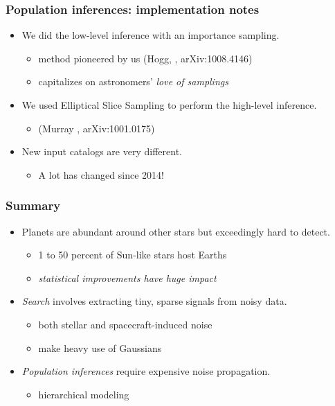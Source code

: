 \documentclass[pdftex]{beamer}
\newcommand{\conclusions}{%
\begin{frame}
  \frametitle{Summary}
  \begin{itemize}
  \item Planets are abundant around other stars but exceedingly hard to detect.
    \begin{itemize}
    \item 1 to 50 percent of Sun-like stars host Earths
    \item \emph{statistical improvements have huge impact}
    \end{itemize}
  \item \emph{Search} involves extracting tiny, sparse signals from noisy data.
    \begin{itemize}
    \item both stellar and spacecraft-induced noise
    \item make heavy use of Gaussians
    \end{itemize}
  \item \emph{Population inferences} require expensive noise propagation.
    \begin{itemize}
    \item hierarchical modeling
    \end{itemize}
  \end{itemize}
\end{frame}}
\begin{document}
\begin{frame}
  \frametitle{Population inferences: implementation notes}
  \begin{itemize}
  \item We did the low-level inference with an importance sampling.
    \begin{itemize}
    \item method pioneered by us {\footnotesize (Hogg, \etal, arXiv:1008.4146)}
    \item capitalizes on astronomers' \emph{love of samplings}
    \end{itemize}
  \item We used Elliptical Slice Sampling to perform the high-level inference.
    \begin{itemize}
    \item {\footnotesize (Murray \etal, arXiv:1001.0175)}
    \end{itemize}
  \item New input catalogs are very different.
    \begin{itemize}
    \item A lot has changed since 2014!
    \end{itemize}
  \end{itemize}
\end{frame}

\conclusions
\end{document}
